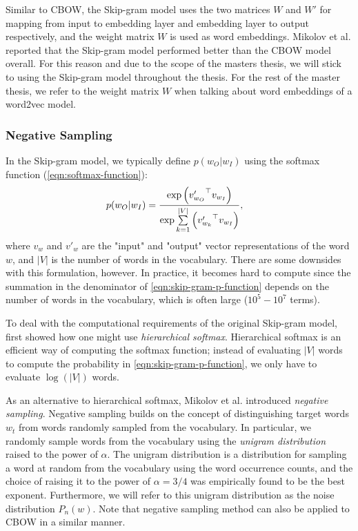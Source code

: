 Similar to CBOW, the Skip-gram model uses the two matrices $W$ and $W'$ for mapping from input to embedding layer and embedding layer to output respectively, and the weight matrix $W$ is used as word embeddings. Mikolov et al. reported that the Skip-gram model performed better than the CBOW model overall. For this reason and due to the scope of the masters thesis, we will stick to using the Skip-gram model throughout the thesis. For the rest of the master thesis, we refer to the weight matrix $W$ when talking about word embeddings of a word2vec model.

\subsubsection{Negative Sampling}
In the Skip-gram model, we typically define $p(w_O | w_I)$ using the softmax function (\cref{eqn:softmax-function}):
\begin{align}
    p(w_O | w_I)
    &= \frac{\exp{ \left( {v'_{w_O}}^\top v_{w_I} \right) }} {\exp{ \sum\limits_{k=1}^{|V|} \left( {v'_{w_k}}^\top v_{w_I} \right) }},
    \label{eqn:skip-gram-p-function}
\end{align}
where $v_w$ and $v'_w$ are the "input" and "output" vector representations of the word $w$, and $|V|$ is the number of words in the vocabulary. There are some downsides with this formulation, however. In practice, it becomes hard to compute since the summation in the denominator of \cref{eqn:skip-gram-p-function} depends on the number of words in the vocabulary, which is often large ($10^5 - 10^7$ terms).

To deal with the computational requirements of the original Skip-gram model, \cite{mikolov2013b} first showed how one might use \textit{hierarchical softmax}. Hierarchical softmax is an efficient way of computing the softmax function; instead of evaluating $|V|$ words to compute the probability in \cref{eqn:skip-gram-p-function}, we only have to evaluate $\log \left( |V| \right)$ words.

As an alternative to hierarchical softmax, Mikolov et al. introduced \textit{negative sampling}. Negative sampling builds on the concept of distinguishing target words $w_t$ from words randomly sampled from the vocabulary. In particular, we randomly sample words from the vocabulary using the \textit{unigram distribution} raised to the power of $\alpha$. The unigram distribution is a distribution for sampling a word at random from the vocabulary using the word occurrence counts, and the choice of raising it to the power of $\alpha = 3/4$ was empirically found to be the best exponent. Furthermore, we will refer to this unigram distribution as the noise distribution $P_n(w)$. Note that negative sampling method can also be applied to CBOW in a similar manner.

